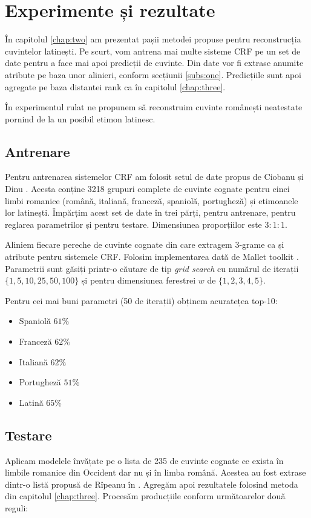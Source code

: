 \chapter{Experimente și rezultate}
În capitolul \ref{chap:two} am prezentat pașii metodei propuse pentru reconstrucția cuvintelor
latinești. Pe scurt, vom antrena mai multe sisteme CRF pe un set de date pentru a face mai apoi 
predicții de cuvinte. Din date vor fi extrase anumite atribute pe baza unor alinieri, conform 
secțiunii \ref{subs:one}. Predicțiile sunt apoi agregate pe baza distantei rank ca în capitolul
\ref{chap:three}.

În experimentul rulat ne propunem să reconstruim cuvinte românești neatestate pornind de la un posibil
etimon latinesc.  

\section{Antrenare}
Pentru antrenarea sistemelor CRF am folosit setul de date propus de Ciobanu și Dinu \cite{dataset}.
Acesta conține 3218 grupuri complete de cuvinte cognate pentru cinci limbi romanice (română, italiană, 
franceză, spaniolă, portugheză) și etimoanele lor latinești. Împărțim acest set de date în trei părți,
pentru antrenare, pentru reglarea parametrilor și pentru testare. Dimensiunea proporțiilor este $3:1:1$.

Aliniem fiecare pereche de cuvinte cognate din care extragem 3-grame ca și atribute pentru sistemele CRF.
Folosim implementarea dată de Mallet toolkit \cite{mallet}. Parametrii sunt găsiți printr-o căutare
de tip \textit{grid search} cu numărul de iterații $\{1, 5, 10, 25, 50, 100\}$ și pentru dimensiunea
ferestrei $w$ de $\{1, 2, 3, 4, 5\}$.

Pentru cei mai buni parametri (50 de iterații) obținem acuratețea top-10:
\begin{itemize}
    \item Spaniolă   $61\%$
    \item Franceză   $62\%$
    \item Italiană   $62\%$
    \item Portugheză $51\%$
    \item Latină     $65\%$
\end{itemize}

\section{Testare}
Aplicam modelele învățate pe o lista de 235 de cuvinte cognate ce exista în limbile romanice din 
Occident dar nu și în limba română. Acestea au fost extrase dintr-o listă propusă de Rîpeanu în \cite{ripeanubook}.
Agregăm apoi rezultatele folosind metoda din capitolul \ref{chap:three}. Procesăm producțiile conform 
următoarelor două reguli:

